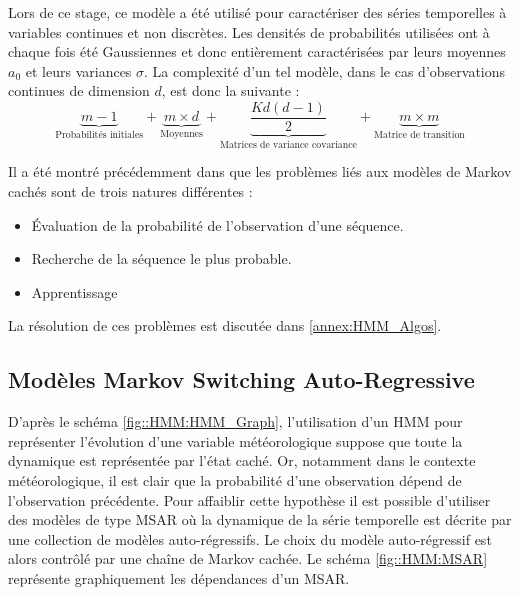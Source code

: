 \documentclass[12pt]{report}
\begin{document}

Lors de ce stage, ce modèle a été utilisé pour caractériser des séries temporelles à variables continues et non discrètes. Les densités de probabilités utilisées ont à chaque fois été Gaussiennes et donc entièrement caractérisées par leurs moyennes $a_0$ et leurs variances $\sigma$. La complexité d'un tel modèle, dans le cas d'observations continues de dimension $d$, est donc la suivante :
\begin{equation}
\underbrace{m-1}_\text{Probabilités initiales}  + \underbrace{m \times d}_\text{Moyennes}  +  \underbrace{\frac{Kd \left(d - 1\right)}{2}}_\text{Matrices de variance covariance} + \underbrace{m \times m}_\text{Matrice de transition}
\label{eq:Model_HMM_ParamNumber} 
\end{equation}

Il a été montré précédemment dans \cite{rabiner_tutorial_1989} que les problèmes liés aux modèles de Markov cachés sont de trois natures différentes : 
\begin{itemize}
	\item Évaluation de la probabilité de l’observation d’une séquence.
	\item Recherche de la séquence le plus probable.
	\item Apprentissage
\end{itemize}

La résolution de ces problèmes est discutée dans \ref{annex:HMM_Algos}.


\subsection{Modèles Markov Switching Auto-Regressive}
\label{subsec:Modeles_MSAR}
D'après le schéma \ref{fig::HMM:HMM_Graph}, l'utilisation d'un HMM pour représenter l'évolution d'une variable météorologique suppose que toute la dynamique est représentée par l'état caché. Or, notamment dans le contexte météorologique, il est clair que la probabilité d'une observation dépend de l'observation précédente. Pour affaiblir cette hypothèse il est possible d'utiliser des modèles de type MSAR où la dynamique de la série temporelle est décrite par une collection de modèles auto-régressifs. Le choix du modèle auto-régressif est alors contrôlé par une chaîne de Markov cachée. Le schéma \ref{fig::HMM:MSAR} représente graphiquement les dépendances d'un MSAR.
\end{document}
